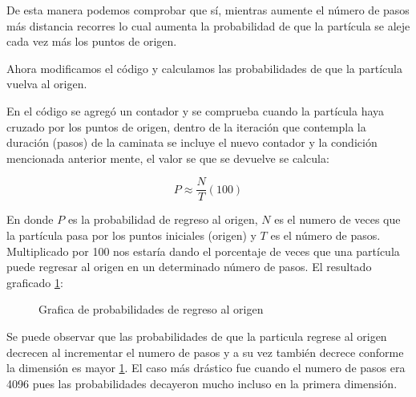 \documentclass{article}
\begin{document}
De esta manera podemos comprobar que sí, mientras aumente el número de pasos más distancia recorres lo cual aumenta la probabilidad de que la partícula se aleje cada vez más los puntos de origen.

Ahora modificamos el código y calculamos las probabilidades de que la partícula vuelva al origen.



En el código se agregó un contador y se comprueba cuando la partícula haya cruzado por los puntos de origen, dentro de la iteración que contempla la duración (pasos) de la caminata se incluye el nuevo contador y la condición mencionada anterior mente, el valor se que se devuelve se calcula: 

\begin{equation}
P\approx \frac{N}{T}(100)
\end{equation}

En donde $P$ es la probabilidad de regreso al origen, $N$ es el numero de veces que la partícula pasa por los puntos iniciales (origen) y $T$ es el número de pasos. Multiplicado por 100 nos estaría dando el porcentaje de veces que una partícula puede regresar al origen en un determinado número de pasos.
El resultado graficado \ref{G}:

\begin{figure}[h]
\centering
{}
\caption{Grafica de probabilidades de regreso al origen}
\label{G}
\end{figure}

Se puede observar que las probabilidades de que la particula regrese al origen decrecen al incrementar el numero de pasos y a su vez también decrece conforme la dimensión es mayor \ref{G}. El caso más drástico fue cuando el numero de pasos era 4096 pues las probabilidades decayeron mucho incluso en la primera dimensión.
\end{document}
